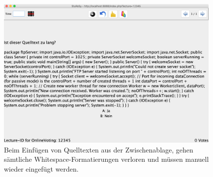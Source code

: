 \begin{figure}[H]
    \includegraphics[width=11cm]{chapter/bewertung/bilder/StuReSy_Problem_3.png}
    \centering
    \caption{Beim Einfügen von Quelltexten aus der Zwischenablage, gehen sämtliche Whitespace-Formatierungen verloren und müssen manuell wieder eingefügt werden.}
    \label{abb:sturesy_problem_3}
\end{figure}
